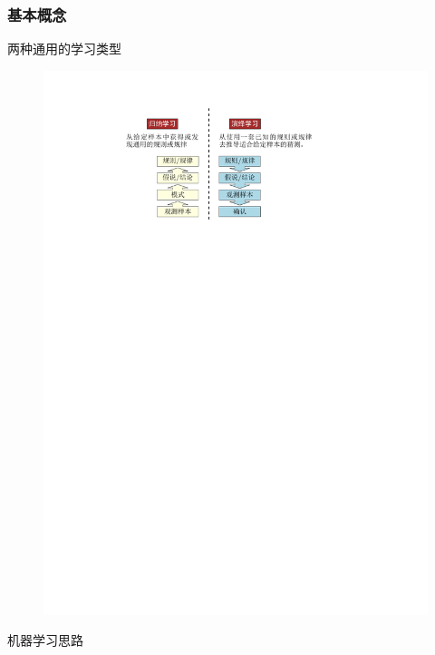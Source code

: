 \subsubsection{基本概念}
\textcolor{main1}{两种通用的学习类型}
\begin{figure}[htbp]
    \centering
    \includegraphics{image/两种通用的学习类型.pdf}
\end{figure}

\textcolor{main1}{机器学习思路}


